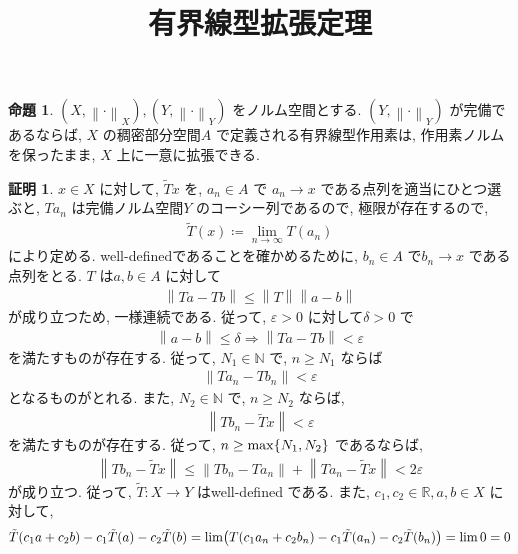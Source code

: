 \documentclass[10pt, fleqn, label-section=none]{bxjsarticle}
\title{有界線型拡張定理}
\date{}
\author{}
\theoremstyle{definition}
\newtheorem{prop}[dfn]{命題}
\newtheorem*{pf*}{証明}
\newcommand{\veps}{\varepsilon}
\newcommand{\paren}[1]{\mleft( #1\mright )}
\newcommand{\cbra}[1]{\mleft\{#1\mright\}}
\newcommand{\norm}[1]{\left\|#1\right\|}
\newcommand{\naraba}{\Rightarrow}
\renewcommand{\;}{\, ; \,}
\begin{document}
\maketitle

\section{}

\begin{prop}$(X, \norm{\cdot}_{X}), (Y, \norm{\cdot}_Y)$ をノルム空間とする. $(Y, \norm{\cdot}_Y)$ が完備であるならば, $X$ の稠密部分空間$A$ で定義される有界線型作用素は, 作用素ノルムを保ったまま, $X$ 上に一意に拡張できる. 

\end{prop}
\begin{pf*}$x \in X$ に対して, $\tilde T x$ を, $a_n \in A$ で $a_n \rightarrow x$ である点列を適当にひとつ選ぶと,  $Ta_n$ は完備ノルム空間$Y$ のコーシー列であるので, 極限が存在するので, 
\begin{align*} \tilde T (x) \coloneqq \lim_{n \rightarrow \infty} T(a_n)  \end{align*}
により定める. well-definedであることを確かめるために, $b_n \in A$ で$b_n \rightarrow x$ である点列をとる. $T$ は$a, b \in A$ に対して
\begin{align*} \norm{Ta- Tb} \leq \norm{T} \norm{a - b}\end{align*}
が成り立つため, 一様連続である. 従って, $\veps > 0$ に対して$\delta > 0$ で
\begin{align*} \norm{a - b} \leq \delta \naraba \norm{Ta - Tb} < \veps \end{align*}
を満たすものが存在する. 従って, $N_1 \in \mathbb N$ で, $n \geq N_1$ ならば
\begin{align*} \norm{Ta_n - Tb_n } < \veps \end{align*}
となるものがとれる. また, $N_2 \in \mathbb N$ で, $n \geq N_2$ ならば, 
\begin{align*} \norm{Tb_n - \tilde T x} < \veps \end{align*} を満たすものが存在する. 従って, $n \geq \max \cbra{N_1, N_2}$ であるならば, 
\begin{align*} \norm{T b_n - \tilde T x} \leq \norm{Tb_n - T a_n} + \norm{T a_n - \tilde T x} < 2 \veps  \end{align*}
が成り立つ. 従って, $\tilde T : X \rightarrow Y$ はwell-defined である. また, $c_1, c_2 \in \mathbb R, a, b \in X$ に対して,
\begin{align*} \tilde T(c_1 a + c_2 b) - c_1 \tilde T (a) - c_2 \tilde T(b) = \lim \paren{T(c_1 a_n + c_2 b_n) - c_1 \tilde T (a_n) - c_2 \tilde T(b_n)  } = \lim 0 = 0 \end{align*}

\end{pf*}
\end{document}
